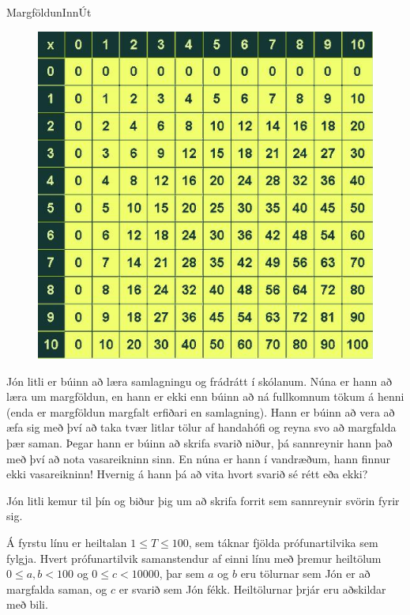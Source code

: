 \begin{problem}{Margföldun}{Inn}{Út}{~}{~}
	
	\begin{figure}
		\vspace{-25pt}
		\begin{center}
			\includegraphics[scale=0.4]{../Margfoldun/table.jpg}
		\end{center}
		\vspace{-30pt}
	\end{figure}

	Jón litli er búinn að læra samlagningu og frádrátt í skólanum. Núna er hann að læra um margföldun, en hann er ekki enn búinn að ná fullkomnum tökum á henni (enda er margföldun margfalt erfiðari en samlagning). Hann er búinn að vera að æfa sig með því að taka tvær litlar tölur af handahófi og reyna svo að margfalda þær saman. Þegar hann er búinn að skrifa svarið niður, þá sannreynir hann það með því að nota vasareikninn sinn. En núna er hann í vandræðum, hann finnur ekki vasareikninn! Hvernig á hann þá að vita hvort svarið sé rétt eða ekki?

	Jón litli kemur til þín og biður þig um að skrifa forrit sem sannreynir svörin fyrir sig.

	\Input

		Á fyrstu línu er heiltalan $1 \leq T \leq 100$, sem táknar fjölda prófunartilvika sem fylgja. Hvert prófunartilvik samanstendur af einni línu með þremur heiltölum $0 \leq a,b < 100$ og $0 \leq c < 10000$, þar sem $a$ og $b$ eru tölurnar sem Jón er að margfalda saman, og $c$ er svarið sem Jón fékk. Heiltölurnar þrjár eru aðskildar með bili.


\end{problem}
